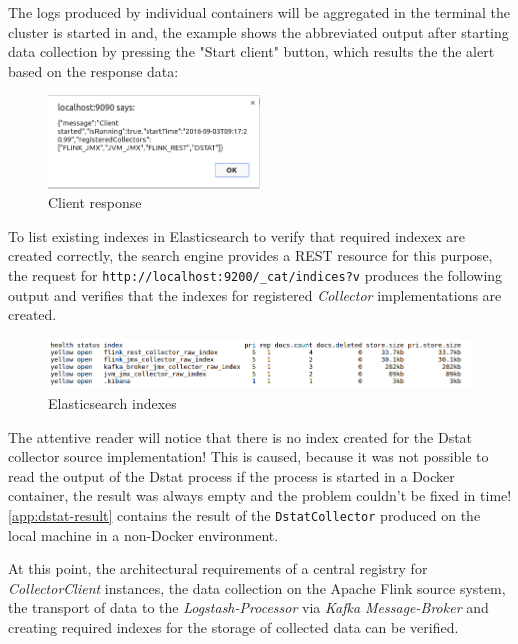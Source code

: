 The logs produced by individual containers will be aggregated in the terminal the cluster is started in and, the example shows the
abbreviated output after starting data collection by pressing the "Start client" button, which results the the alert based on the response data:

\begin{figure}[H]
	\centering
	\includegraphics[width=0.5\textwidth]{../images/11-alert.png}
	\caption{Client response}
	\label{fig:alert}
\end{figure}

To list existing indexes in Elasticsearch to verify that required indexex are created correctly, the search engine provides a
REST resource for this purpose, the request for \verb|http://localhost:9200/_cat/indices?v| produces the following output and verifies
that the indexes for registered \textit{Collector} implementations are created.
\begin{figure}[H]
	\centering
	\includegraphics[width=1.0\textwidth]{../images/12-indexes.png}
	\caption{Elasticsearch indexes}
	\label{fig:indexes}
\end{figure}

The attentive reader will notice that there is no index created for the Dstat collector source implementation! This is caused, because
it was not possible to read the output of the Dstat process if the process is started in a Docker container, the result was always empty
and the problem couldn't be fixed in time! \autoref{app:dstat-result} contains the result of the \verb|DstatCollector| produced
on the local machine in a non-Docker environment.


At this point, the architectural requirements of a central registry for \textit{CollectorClient} instances, the data collection on the
Apache Flink source system, the transport of data to the \textit{Logstash-Processor} via \textit{Kafka Message-Broker} and creating required
indexes for the storage of collected data can be verified.

